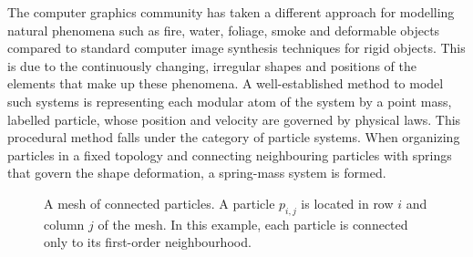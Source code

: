 \documentclass[\home/main.tex]{subfiles}
\begin{document}
The computer graphics community has taken a different approach for modelling natural phenomena such as fire, water, foliage, smoke and deformable objects compared to standard computer image synthesis techniques for rigid objects. This is due to the continuously changing, irregular shapes and positions of the elements that make up these phenomena. A well-established method to model such systems is representing each modular atom of the system by a point mass, labelled particle, whose position and velocity are governed by physical laws. This procedural method falls under the category of particle systems. When organizing particles in a fixed topology and connecting neighbouring particles with springs that govern the shape deformation, a spring-mass system is formed.

\begin{figure}[htb]
    \centering
    
    \caption[Mesh of connected particles]{A mesh of connected particles. A particle $p_{i,j}$ is located in row $i$ and column $j$ of the mesh. In this example, each particle is connected only to its first-order neighbourhood.}
    \label{fig:mesh_particles}
\end{figure}
\end{document}
